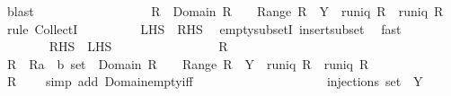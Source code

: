 \begin{isabellebody}
\ blast\isanewline
\ \ \ \ \ \ \isanewline
\ \ \ \ \ \ \isamarkupfalse%
\ \isamarkupfalse%
\ {\isachardoublequoteopen}{\isacharbraceleft}{\isacharbraceright}\ {\isasymin}\ {\isacharbraceleft}R\ {\isachardot}\ Domain\ R\ {\isacharequal}\ {\isacharbraceleft}{\isacharbraceright}\ {\isasymand}\ Range\ R\ {\isasymsubseteq}\ Y\ {\isasymand}\ runiq\ R\ {\isasymand}\ runiq\ {\isacharparenleft}R{\isasyminverse}{\isacharparenright}{\isacharbraceright}{\isachardoublequoteclose}\ \isamarkupfalse%
\ {\isacharparenleft}rule\ CollectI{\isacharparenright}\isanewline
\ \ \ \ \ \ \isamarkupfalse%
\ \isamarkupfalse%
\ {\isachardoublequoteopen}{\isacharquery}LHS\ {\isasymsubseteq}\ {\isacharquery}RHS{\isachardoublequoteclose}\ \isamarkupfalse%
\ empty{\isacharunderscore}subsetI\ insert{\isacharunderscore}subset\ \isamarkupfalse%
\ fast\isanewline
\ \ \ \ \isamarkupfalse%
\isanewline
\ \ \ \ \ \ \isamarkupfalse%
\ {\isachardoublequoteopen}{\isacharquery}RHS\ {\isasymsubseteq}\ {\isacharquery}LHS{\isachardoublequoteclose}\isanewline
\ \ \ \ \ \ \isamarkupfalse%
\isanewline
\ \ \ \ \ \ \ \ \isamarkupfalse%
\ R\isanewline
\ \ \ \ \ \ \ \ \isamarkupfalse%
\ {\isachardoublequoteopen}R\ {\isasymin}\ {\isacharbraceleft}R{\isacharcolon}{\isacharcolon}{\isacharparenleft}{\isacharparenleft}{\isacharprime}a\ {\isasymtimes}\ {\isacharprime}b{\isacharparenright}\ set{\isacharparenright}\ {\isachardot}\ Domain\ R\ {\isacharequal}\ {\isacharbraceleft}{\isacharbraceright}\ {\isasymand}\ Range\ R\ {\isasymsubseteq}\ Y\ {\isasymand}\ runiq\ R\ {\isasymand}\ runiq\ {\isacharparenleft}R{\isasyminverse}{\isacharparenright}{\isacharbraceright}{\isachardoublequoteclose}\isanewline
\ \ \ \ \ \ \ \ \isamarkupfalse%
\ \isamarkupfalse%
\ {\isachardoublequoteopen}R\ {\isasymin}\ {\isacharbraceleft}{\isacharbraceleft}{\isacharbraceright}{\isacharbraceright}{\isachardoublequoteclose}\ \isamarkupfalse%
\ {\isacharparenleft}simp\ add{\isacharcolon}\ Domain{\isacharunderscore}empty{\isacharunderscore}iff{\isacharparenright}\isanewline
\ \ \ \ \ \ \isamarkupfalse%
\isanewline
\ \ \ \ \isamarkupfalse%
\isanewline
\ \ \ \ \isamarkupfalse%
\ \isamarkupfalse%
\ {\isachardoublequoteopen}{\isasymdots}\ {\isacharequal}\ injections\ {\isacharparenleft}set\ {\isacharbrackleft}{\isacharbrackright}{\isacharparenright}\ Y{\isachardoublequoteclose}\isanewline

\end{isabellebody}
